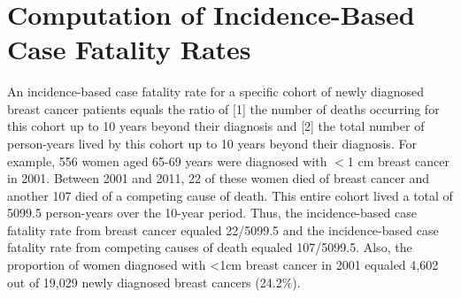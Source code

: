 \documentclass[11pt,letterpaper]{article}
\theoremstyle{plain}
\theoremstyle{remark}
\numberwithin{equation}{section}
\begin{document}
\blind \title{\bf \tit} \maketitle \fi


\thispagestyle{empty}
\setcounter{page}{0}



\newpage
\clearpage
 \setcounter{table}{0}  %
 \setcounter{figure}{0}  %
 \setcounter{page}{1}
 \renewcommand{\figurename}{eFigure}
 \renewcommand{\tablename}{eTable}
\appendix

\section{Computation of Incidence-Based Case Fatality Rates}
An incidence-based case fatality rate for a specific cohort of newly
diagnosed breast cancer patients equals the ratio of [1] the number of
deaths occurring for this cohort up to 10 years beyond their diagnosis
and [2] the total number of person-years lived by this cohort up to 10
years beyond their diagnosis.  For example, 556 women aged 65-69 years
were diagnosed with $<$1 cm breast cancer in 2001.  Between 2001 and
2011, 22 of these women died of breast cancer and another 107 died of
a competing cause of death.  This entire cohort lived a total of
5099.5 person-years over the 10-year period.  Thus, the
incidence-based case fatality rate from breast cancer equaled
22/5099.5 and the incidence-based case fatality rate from competing
causes of death equaled 107/5099.5.  Also, the proportion of women
diagnosed with <1cm breast cancer in 2001 equaled 4,602 out of 19,029
newly diagnosed breast cancers (24.2\%).
\end{document}
